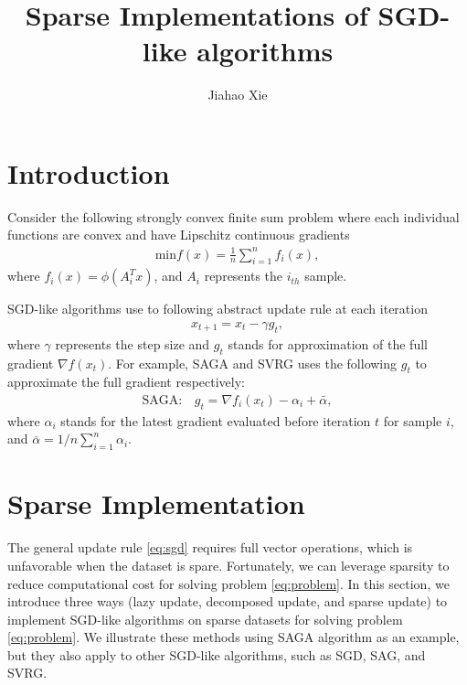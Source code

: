 \documentclass{article}
\title{Sparse Implementations of SGD-like algorithms}
\author{Jiahao Xie}
\begin{document}
\maketitle

\section{Introduction}

Consider the following strongly convex finite sum problem where each individual functions are convex and have Lipschitz continuous gradients
\begin{equation} \label{eq:problem}
\begin{aligned}
    \mathrm{min} f(x) = \frac{1}{n} \sum_{i=1}^{n} f_i (x),
\end{aligned}
\end{equation}
where $f_i(x) = \phi(A_i^T x)$, and $A_i$ represents the $i_{th}$ sample.

SGD-like algorithms use to following abstract update rule at each iteration
\begin{equation} \label{eq:sgd}
\begin{aligned}
    x_{t+1} = x_{t} - \gamma g_{t},
\end{aligned}
\end{equation}
where $\gamma$ represents the step size and $g_{t}$ stands for approximation of the full gradient $\nabla f(x_t)$. For example, SAGA and SVRG uses the following $g_{t}$ to approximate the full gradient respectively:
\begin{equation} \label{eq:saga}
\begin{aligned}
    \mathrm{SAGA: } &g_{t} = \nabla f_i(x_t) - \alpha_i + \bar{\alpha},
\end{aligned}
\end{equation}
where $\alpha_i$ stands for the latest gradient evaluated before iteration $t$ for sample $i$, and $\bar{\alpha} = 1/n \sum_{i=1}^n \alpha_i$.

\section{Sparse Implementation}
The general update rule \eqref{eq:sgd} requires full vector operations, which is unfavorable when the dataset is spare. Fortunately, we can leverage sparsity to reduce computational cost for solving problem \eqref{eq:problem}. In this section, we introduce three ways (lazy update, decomposed update, and sparse update) to implement SGD-like algorithms on sparse datasets for solving problem \eqref{eq:problem}. We illustrate these methods using SAGA algorithm as an example, but they also apply to other SGD-like algorithms, such as SGD, SAG, and SVRG.
\end{document}
